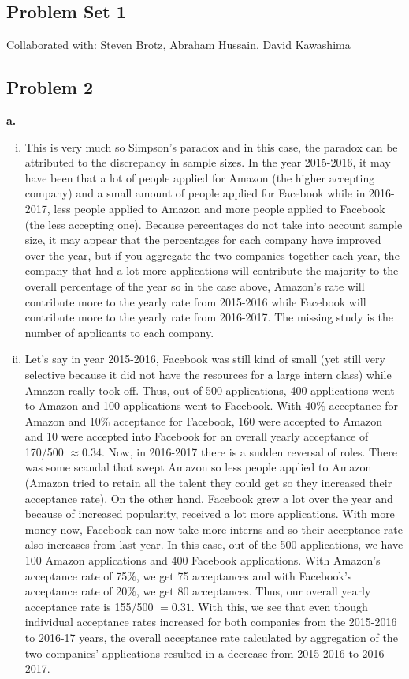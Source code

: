 \documentclass[12 pt]{article}
\begin{document}
	\begin{center}
		\section*{Problem Set 1}
	\end{center}
	
	\noindent Collaborated with: Steven Brotz, Abraham Hussain, David Kawashima \\
	\subsection*{Problem 2}
	\noindent \textbf{a.}
	\begin{enumerate}[i.]
		\item This is very much so Simpson's paradox and in this case, the paradox can be attributed to the discrepancy in sample sizes. In the year 2015-2016, it may have been that a lot of people applied for Amazon (the higher accepting company) and a small amount of people applied for Facebook while in 2016-2017, less people applied to Amazon and more people applied to Facebook (the less accepting one). Because percentages do not take into account sample size, it may appear that the percentages for each company have improved over the year, but if you aggregate the two companies together each year, the company that had a lot more applications will contribute the majority to the overall percentage of the year so in the case above, Amazon's rate will contribute more to the yearly rate from 2015-2016 while Facebook will contribute more to the yearly rate from 2016-2017. The missing study is the number of applicants to each company.
		\item Let's say in year 2015-2016, Facebook was still kind of small (yet still very selective because it did not have the resources for a large intern class) while Amazon really took off. Thus, out of 500 applications, 400 applications went to Amazon and 100 applications went to Facebook. With 40$\%$ acceptance for Amazon and 10$\%$ acceptance for Facebook, 160 were accepted to Amazon and 10 were accepted into Facebook for an overall yearly acceptance of 170/500 $\approx 0.34$. Now, in 2016-2017 there is a sudden reversal of roles. There was some scandal that swept Amazon so less people applied to Amazon (Amazon tried to retain all the talent they could get so they increased their acceptance rate). On the other hand, Facebook grew a lot over the year and because of increased popularity, received a lot more applications. With more money now, Facebook can now take more interns and so their acceptance rate also increases from last year. In this case, out of the 500 applications, we have 100 Amazon applications and 400 Facebook applications. With Amazon's acceptance rate of 75$\%$, we get 75 acceptances and with Facebook's acceptance rate of 20$\%$, we get 80 acceptances. Thus, our overall yearly acceptance rate is 155/500 $= 0.31$.  With this, we see that even though individual acceptance rates increased for both companies from the 2015-2016 to 2016-17 years, the overall acceptance rate calculated by aggregation of the two companies' applications resulted in a decrease from 2015-2016 to 2016-2017. 
	\end{enumerate}
\end{document}
